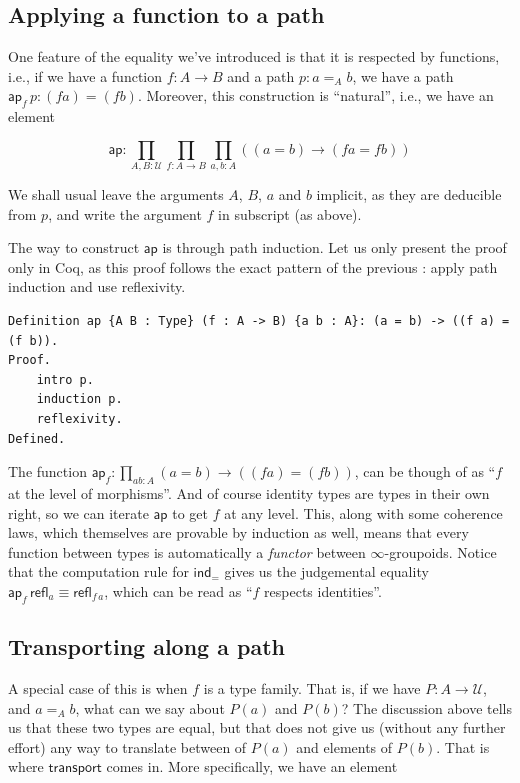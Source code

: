 \documentclass[12 pt]{amsart}
\theoremstyle{definition}
\theoremstyle{remark}
\newcommand{\Type}{\mathcal{U}}
\newcommand{\trans}{\mathsf{transport}}
\newcommand{\ap}{\mathsf{ap}}
\newcommand{\refl}{\mathsf{refl}}
\newcommand{\ind}{\mathsf{ind}}
\begin{document}
\subsection{Applying a function to a path}
One feature of the equality we've introduced is that it is respected by functions, i.e., if we have a function $f : A \to B$ and a path $p : a =_A b$, we have a path $\ap_{f}\, p : (f a) = (f b)$. Moreover, this construction is ``natural'', i.e., we have an element 

\begin{equation}
    \ap : \prod_{A, B : \Type} \prod_{f : A \to B} \prod_{a, b : A} \left((a = b) \to (f a = f b)\right)
    \label{eqn:ap}
\end{equation}

We shall usual leave the arguments $A$, $B$, $a$ and $b$ implicit, as they are deducible from $p$, and write the argument $f$ in subscript (as above).

The way to construct $\ap$ is through path induction. Let us only present the proof only in Coq, as this proof follows the exact pattern of the previous : apply path induction and use reflexivity.

\begin{lstlisting}
Definition ap {A B : Type} (f : A -> B) {a b : A}: (a = b) -> ((f a) = (f b)).
Proof.
    intro p.
    induction p.
    reflexivity.
Defined.
\end{lstlisting}

The function $\ap_f : \prod_{a b : A} (a = b) \to ((f a) = (f b))$, can be though of as ``$f$ at the level of morphisms''. And of course identity types are types in their own right, so we can iterate $\ap$ to get $f$ at any level. This, along with some coherence laws, which themselves are provable by induction as well, means that every function between types is automatically a \textit{functor} between $\infty$-groupoids. Notice that the computation rule for $\ind_=$ gives us the judgemental equality $\ap_f\,\refl_a \equiv \refl_{f\,a}$, which can be read as ``$f$ respects identities''.

\subsection{Transporting along a path}
\label{subsec:trans}
A special case of this is when $f$ is a type family. That is, if we have $P : A \to \Type$, and $a =_A b$, what can we say about $P(a)$ and $P(b)$? The discussion above tells us that these two types are equal, but that does not give us (without any further effort) any way to translate between  of $P(a)$ and elements of $P(b)$. That is where $\trans$ comes in. More specifically, we have an element
\end{document}
